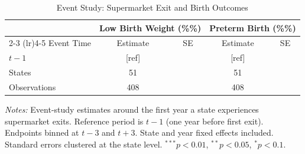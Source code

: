 \begin{table}[htbp]
\centering
\begin{threeparttable}
\caption{Event Study: Supermarket Exit and Birth Outcomes}
\label{tab:event_study}
\begin{tabular}{lcccc}
\hline\hline
 & \multicolumn{2}{c}{Low Birth Weight (\%\%)} & \multicolumn{2}{c}{Preterm Birth (\%\%)} \\
\cmidrule(lr){2-3} \cmidrule(lr){4-5}
Event Time & Estimate & SE & Estimate & SE \\
\hline
  $t-1$ & [ref] & & [ref] & \\
\hline
States & 51 & & 51 & \\
Observations & 408 & & 408 & \\
\hline\hline
\end{tabular}
\begin{tablenotes}[flushleft]
\footnotesize
\item \textit{Notes:} Event-study estimates around the first year a state experiences
supermarket exits. Reference period is $t-1$ (one year before first exit).
Endpoints binned at $t-3$ and $t+3$.
State and year fixed effects included. Standard errors clustered at the state level.
$^{***}p<0.01$, $^{**}p<0.05$, $^{*}p<0.1$.
\end{tablenotes}
\end{threeparttable}
\end{table}
